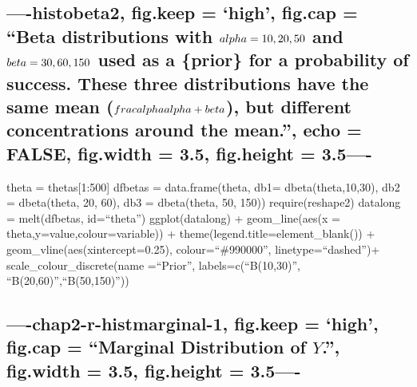 \documentclass[]{article}
\begin{document}
\subsection{\texorpdfstring{----histobeta2, fig.keep = `high', fig.cap =
``Beta distributions with \(\\alpha=10,20,50\) and \(\\beta=30,60,150\)
used as a \{prior\} for a probability of success. These three
distributions have the same mean (\(\\frac{\\alpha}{\\alpha +\\beta}\)),
but different concentrations around the mean.'', echo = FALSE, fig.width
= 3.5, fig.height =
3.5----}{----histobeta2, fig.keep = high, fig.cap = Beta distributions with \textbackslash{}\textbackslash{}alpha=10,20,50 and \textbackslash{}\textbackslash{}beta=30,60,150 used as a \{prior\} for a probability of success. These three distributions have the same mean (\textbackslash{}\textbackslash{}frac\{\textbackslash{}\textbackslash{}alpha\}\{\textbackslash{}\textbackslash{}alpha +\textbackslash{}\textbackslash{}beta\}), but different concentrations around the mean., echo = FALSE, fig.width = 3.5, fig.height = 3.5----}}\label{histobeta2-fig.keep-high-fig.cap-beta-distributions-with-alpha102050-and-beta3060150-used-as-a-prior-for-a-probability-of-success.-these-three-distributions-have-the-same-mean-fracalphaalpha-beta-but-different-concentrations-around-the-mean.-echo-false-fig.width-3.5-fig.height-3.5-}

theta = thetas{[}1:500{]} dfbetas = data.frame(theta, db1=
dbeta(theta,10,30), db2 = dbeta(theta, 20, 60), db3 = dbeta(theta, 50,
150)) require(reshape2) datalong = melt(dfbetas, id=``theta'')
ggplot(datalong) + geom\_line(aes(x = theta,y=value,colour=variable)) +
theme(legend.title=element\_blank()) + geom\_vline(aes(xintercept=0.25),
colour=``\#990000'', linetype=``dashed'')+ scale\_colour\_discrete(name
=``Prior'', labels=c(``B(10,30)'', ``B(20,60)'',``B(50,150)''))

\subsection{\texorpdfstring{----chap2-r-histmarginal-1, fig.keep =
`high', fig.cap = ``Marginal Distribution of \(Y\).'', fig.width = 3.5,
fig.height =
3.5----}{----chap2-r-histmarginal-1, fig.keep = high, fig.cap = Marginal Distribution of Y., fig.width = 3.5, fig.height = 3.5----}}\label{chap2-r-histmarginal-1-fig.keep-high-fig.cap-marginal-distribution-of-y.-fig.width-3.5-fig.height-3.5-}
\end{document}
